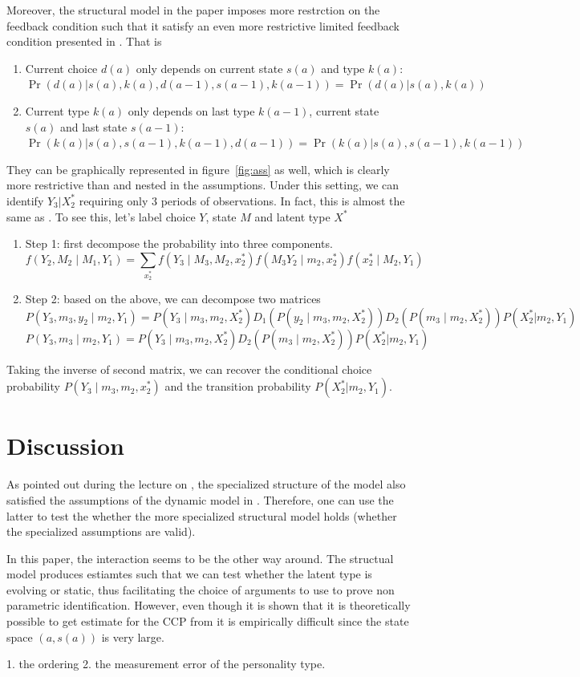 \documentclass[12pt]{article}
\begin{document}
Moreover, the structural model in the paper imposes more restrction on the feedback condition such that it satisfy an even more restrictive limited feedback condition presented in \citet{hu2017simple}. That is 
\begin{enumerate}
    \item Current choice $d(a)$ only depends on current state $s(a)$ and type $k(a)$: $\Pr(d(a)|s(a),k(a),d(a-1),s(a-1),k(a-1))=\Pr(d(a)|s(a),k(a))$
    \item Current type $k(a)$ only depends on last type $k(a-1)$, current state $s(a)$ and last state $s(a-1)$: $\Pr(k(a)|s(a),s(a-1),k(a-1),d(a-1))=\Pr(k(a)|s(a),s(a-1),k(a-1))$
\end{enumerate}
They can be graphically represented in figure~\ref{fig:ass} as well, which is clearly more restrictive than and nested in the \citet{hu2012nonparametric} assumptions. Under this setting, we can identify $Y_3|X_2^*$ requiring only 3 periods of observations.  In fact, this is almost the same as \citet{hu2008identification}. To see this, let's label choice $Y$, state $M$ and latent type $X^*$
\begin{enumerate}
    \item Step 1: first decompose the probability into three components.
$$f(Y_2, M_2 \mid M_1, Y_1) = \sum_{x_2^*} f(Y_3 \mid M_3,M_2, x_2^*) f(M_3 Y_2 \mid m_2, x_2^*) f(x_2^* \mid M_2, Y_1)$$
\item Step 2: based on the above, we can decompose two matrices
$$P(Y_3, m_3 ,y_2 \mid m_2, Y_1) = P(Y_3 \mid m_3, m_2, X_2^*) D_1 (P(y_2 \mid m_3, m_2, X_2^*))D_2(P(m_3\mid m_2,X_2^*))P(X_2^*|m_2,Y_1)$$
$$P(Y_3, m_3\mid m_2, Y_1) = P(Y_3 \mid m_3, m_2, X_2^*) D_2(P(m_3\mid m_2,X_2^*))P(X_2^*|m_2,Y_1)$$
\end{enumerate}
Taking the inverse of second matrix, we can recover the conditional choice probability $P(Y_3 \mid m_3, m_2, x_2^*)$ and the transition probability $P(X_2^*|m_2,Y_1)$. 

\section{Discussion}
As pointed out during the lecture on \citet{postel2002equilibrium}, the specialized structure of the model also satisfied the assumptions of the dynamic model in \citet{bonhomme2019distributional}. Therefore, one can use the latter to test the whether the more specialized structural model holds (whether the specialized assumptions are valid).

In this paper, the interaction seems to be the other way around. The structual model produces estiamtes such that we can test whether the latent type is evolving or static, thus facilitating the choice of arguments to use to prove non parametric identification. However, even though it is shown that it is theoretically possible to get estimate for the CCP from \citet{hu2017simple} it is empirically difficult since the state space $(a,s(a))$ is very large.

1. the ordering
2. the measurement error of the personality type.

\pagebreak \newpage 
\end{document}
